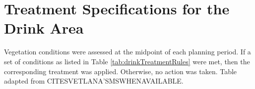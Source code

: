 
\chapter{Treatment Specifications for the Drink Area}
\label{chap:appBTreatmentSpec}

Vegetation conditions were assessed at the midpoint of each planning period. If a set of conditions as listed in Table \ref{tab:drinkTreatmentRules} were met, then the corresponding treatment was applied. Otherwise, no action was taken. Table adapted from CITESVETLANA'SMSWHENAVAILABLE.

